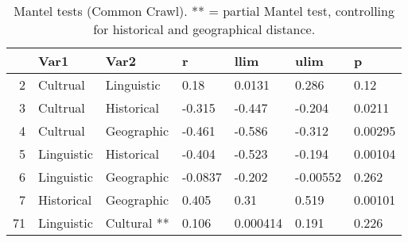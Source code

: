 \begin{table}[ht]
\centering
\begin{tabular}{rllllll}
  \hline
 & Var1 & Var2 & r & llim & ulim & p \\ 
  \hline
2 & Cultrual & Linguistic & 0.18 & 0.0131 & 0.286 & 0.12 \\ 
  3 & Cultrual & Historical & -0.315 & -0.447 & -0.204 & 0.0211 \\ 
  4 & Cultrual & Geographic & -0.461 & -0.586 & -0.312 & 0.00295 \\ 
  5 & Linguistic & Historical & -0.404 & -0.523 & -0.194 & 0.00104 \\ 
  6 & Linguistic & Geographic & -0.0837 & -0.202 & -0.00552 & 0.262 \\ 
  7 & Historical & Geographic & 0.405 & 0.31 & 0.519 & 0.00101 \\ 
  71 & Linguistic & Cultural ** & 0.106 & 0.000414 & 0.191 & 0.226 \\ 
   \hline
\end{tabular}
\caption{Mantel tests (Common Crawl). ** = partial Mantel test, controlling for historical and geographical distance.} 
\end{table}
